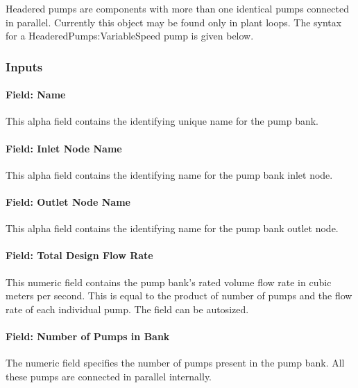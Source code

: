 Headered pumps are components with more than one identical pumps connected in parallel. Currently this object may be found only in plant loops. The syntax for a HeaderedPumps:VariableSpeed pump is given below.

\subsubsection{Inputs}\label{inputs-4-024}

\paragraph{Field: Name}\label{field-name-4-021}

This alpha field contains the identifying unique name for the pump bank.

\paragraph{Field: Inlet Node Name}\label{field-inlet-node-name-4}

This alpha field contains the identifying name for the pump bank inlet node.

\paragraph{Field: Outlet Node Name}\label{field-outlet-node-name-4}

This alpha field contains the identifying name for the pump bank outlet node.

\paragraph{Field: Total Design Flow Rate}\label{field-total-design-flow-rate-1}

This numeric field contains the pump bank's rated volume flow rate in cubic meters per second. This is equal to the product of number of pumps and the flow rate of each individual pump. The field can be autosized.

\paragraph{Field: Number of Pumps in Bank}\label{field-number-of-pumps-in-bank-1}

The numeric field specifies the number of pumps present in the pump bank. All these pumps are connected in parallel internally.

